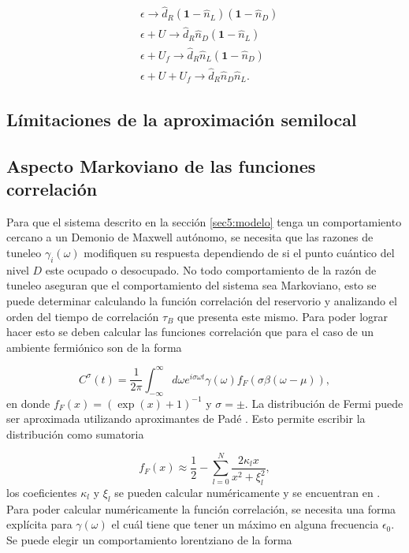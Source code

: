 \begin{appendixs}
\begin{align*}
    &\epsilon \to \hat{d}_{R}(\textbf{1}-\hat{n}_{L})(\textbf{1}-\hat{n}_{D})\\
   &\epsilon + U \to \hat{d}_{R}\hat{n}_{D}(\textbf{1}-\hat{n}_{L})\\
    &\epsilon +U_{f}\to \hat{d}_{R}\hat{n}_{L}(\textbf{1}-\hat{n}_{D})\\
    &\epsilon +U+U_{f}\to \hat{d}_{R}\hat{n}_{D}\hat{n}_{L}.
\end{align*}

\label{apendix5frecuencygroup}

\subsection{Límitaciones de la aproximación semilocal}

\label{apendix5límites}

\subsection{Aspecto Markoviano de las funciones correlación }
Para que el sistema descrito en la sección \ref{sec5:modelo} tenga un comportamiento cercano a un Demonio de Maxwell autónomo, se necesita que las razones de tuneleo $\gamma_{i}(\omega)$ modifiquen su respuesta dependiendo de si el punto cuántico del nivel $D$ este ocupado o desocupado. No todo comportamiento de la razón de tuneleo aseguran que el comportamiento del sistema sea Markoviano, esto se puede determinar calculando la función correlación del reservorio y analizando el orden del tiempo de correlación $\tau_{B}$ que presenta este mismo. Para poder lograr hacer esto se deben calcular las funciones correlación que para el caso de un ambiente fermiónico son de la forma

\begin{equation*}
    C^{\sigma}(t) = \frac{1}{2\pi} \int_{-\infty}^{\infty} d\omega e^{i\sigma \omega t} \gamma(\omega) f_{F}(\sigma \beta(\omega-\mu)),
\end{equation*}
en donde $f_{F}(x) = (\exp(x)+1)^{-1}$ y $\sigma = \pm$. La distribución de Fermi puede ser aproximada utilizando aproximantes de Padé \cite{hu2011pade,schinabeck2019hierarchical}. Esto permite escribir la distribución como sumatoria

\begin{equation}
    f_{F}(x) \approx \frac{1}{2} - \sum_{l=0}^{N} \frac{ 2 \kappa_{l}x }{ x^{2} + \xi^{2}_{l} },
    \label{apendix5:pade}
\end{equation}
los coeficientes $\kappa_{l}$ y $\xi_{l}$ se pueden calcular numéricamente y se encuentran en \cite{hu2011pade}. Para poder calcular numéricamente la función correlación, se necesita una forma explícita para $\gamma(\omega)$ el cuál tiene que tener un máximo en alguna frecuencia $\epsilon_{0}$. Se puede elegir un comportamiento lorentziano de la forma


\end{appendixs}
